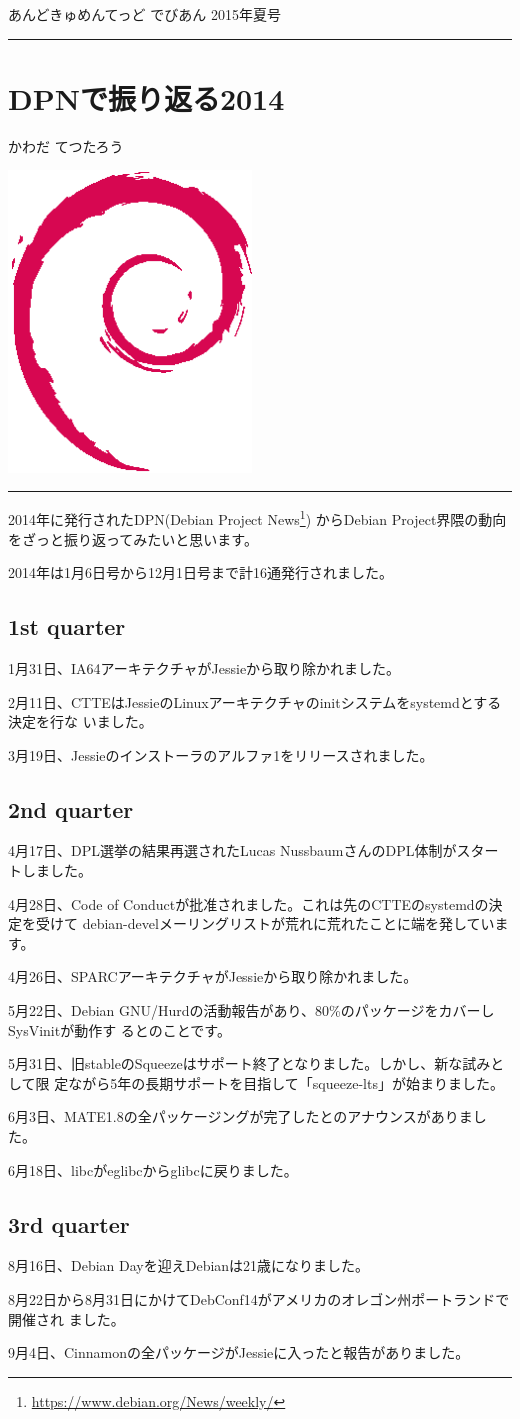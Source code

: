 \documentclass[mingoth,a4paper]{jsarticle}
\renewcommand{\dancersection}[2]{%
\newpage
あんどきゅめんてっど でびあん 2015年夏号
%
\vspace{0.1mm}\\
{\color{dancerdarkblue}\rule{\hsize}{2mm}}

%
%
\begin{minipage}[t]{0.6\hsize}
\color{dancerdarkblue}
\vspace{1cm}
\section{#1}
\hfill{}#2\\
\end{minipage}
\begin{minipage}[t]{0.4\hsize}
\vspace{-2cm}
\hfill{}\includegraphics[height=8cm]{image200502/openlogo-nd.eps}\\
\vspace{-5cm}
\end{minipage}
%
{\color{dancerlightblue}\rule{0.66\hsize}{2mm}}
%
\vspace{2cm}
}
\begin{document}
\dancersection{DPNで振り返る2014}{かわだ てつたろう}

2014年に発行されたDPN(Debian Project News\footnote{\url{https://www.debian.org/News/weekly/}})
からDebian Project界隈の動向をざっと振り返ってみたいと思います。

2014年は1月6日号から12月1日号まで計16通発行されました。

\subsection{1st quarter}

1月31日、IA64アーキテクチャがJessieから取り除かれました。

2月11日、CTTEはJessieのLinuxアーキテクチャのinitシステムをsystemdとする決定を行な
いました。

3月19日、Jessieのインストーラのアルファ1をリリースされました。

\subsection{2nd quarter}
4月17日、DPL選挙の結果再選されたLucas NussbaumさんのDPL体制がスタートしました。

4月28日、Code of Conductが批准されました。これは先のCTTEのsystemdの決定を受けて
debian-develメーリングリストが荒れに荒れたことに端を発しています。

4月26日、SPARCアーキテクチャがJessieから取り除かれました。

5月22日、Debian GNU/Hurdの活動報告があり、80\%のパッケージをカバーしSysVinitが動作す
るとのことです。

5月31日、旧stableのSqueezeはサポート終了となりました。しかし、新な試みとして限
定ながら5年の長期サポートを目指して「squeeze-lts」が始まりました。

6月3日、MATE1.8の全パッケージングが完了したとのアナウンスがありました。

6月18日、libcがeglibcからglibcに戻りました。

\subsection{3rd quarter}

8月16日、Debian Dayを迎えDebianは21歳になりました。

8月22日から8月31日にかけてDebConf14がアメリカのオレゴン州ポートランドで開催され
ました。

9月4日、Cinnamonの全パッケージがJessieに入ったと報告がありました。
\end{document}
